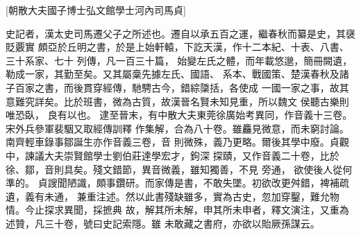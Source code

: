 %

\pagestyle{preShiji}\setcounter{footnote}{0}\mainfont

[朝散大夫國子博士弘文館學士河內司馬貞]

史記者，漢太史司馬遷父子之所述也。遷自以承五百之運，繼春秋而纂是史，其襃貶覈實
頗亞於丘明之書，於是上始軒轅，下訖天漢，作十二本紀、十表、八書、三十系家、七十
列傳，凡一百三十篇，
%
%
始變左氏之體，而年載悠邈，簡冊闕遺，勒成一家，其勤至矣。又其屬稾先據左氏、國語、
系本、戰國策、楚漢春秋及諸子百家之書，而後貫穿經傳，馳騁古今，錯綜櫽括，各使成
一國一家之事，故其意難究詳矣。比於班書，微為古質，故漢晉名賢未知見重，所以魏文
侯聽古樂則唯恐臥，
%
良有以也。
%
\parswitch
%
逮至晉末，有中散大夫東莞徐廣始考異同，作音義十三卷。宋外兵參軍裴駰又取經傳訓釋
作集解，合為八十卷。雖麤見微意，而未窮討論。南齊輕車錄事鄒誕生亦作音義三卷，音
則微殊，義乃更略。爾後其學中廢。貞觀中，諫議大夫崇賢館學士劉伯莊達學宏才，鉤深
探賾，又作音義二十卷，比於徐、鄒，音則具矣。殘文錯節，異音微義，雖知獨善，不見
旁通，
%
%
欲使後人從何準的。
%
\parswitch
%
貞謏聞陋識，頗事鑽研。而家傳是書，不敢失墜。初欲改更舛錯，裨補疏遺，義有未通，
兼重注述。然以此書殘缺雖多，實為古史，忽加穿鑿，難允物情。今止探求異聞，採摭典
%
故，解其所未解，申其所未申者，釋文演注，又重為述贊，凡三十卷，號曰史記索隱。雖
未敢藏之書府，亦欲以貽厥孫謀云。
%

